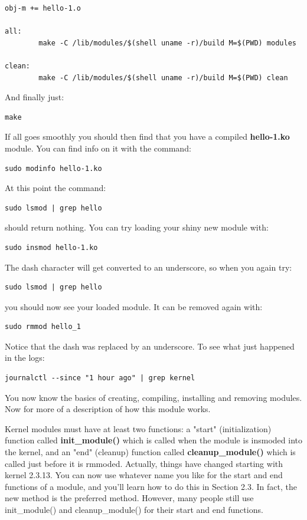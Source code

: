 \documentclass[11pt]{article}
\begin{document}
\begin{verbatim}
obj-m += hello-1.o

all:
        make -C /lib/modules/$(shell uname -r)/build M=$(PWD) modules

clean:
        make -C /lib/modules/$(shell uname -r)/build M=$(PWD) clean
\end{verbatim}

And finally just:

\begin{verbatim}
make
\end{verbatim}

If all goes smoothly you should then find that you have a compiled \textbf{hello-1.ko} module. You can find info on it with the command:

\begin{verbatim}
sudo modinfo hello-1.ko
\end{verbatim}

At this point the command:

\begin{verbatim}
sudo lsmod | grep hello
\end{verbatim}

should return nothing. You can try loading your shiny new module with:

\begin{verbatim}
sudo insmod hello-1.ko
\end{verbatim}

The dash character will get converted to an underscore, so when you again try:

\begin{verbatim}
sudo lsmod | grep hello
\end{verbatim}

you should now see your loaded module. It can be removed again with:

\begin{verbatim}
sudo rmmod hello_1
\end{verbatim}

Notice that the dash was replaced by an underscore. To see what just happened in the logs:

\begin{verbatim}
journalctl --since "1 hour ago" | grep kernel
\end{verbatim}

You now know the basics of creating, compiling, installing and removing modules. Now for more of a description of how this module works.

Kernel modules must have at least two functions: a "start" (initialization) function called \textbf{init\_module()} which is called when the module is insmoded into the kernel, and an "end" (cleanup) function called \textbf{cleanup\_module()} which is called just before it is rmmoded. Actually, things have changed starting with kernel 2.3.13. You can now use whatever name you like for the
start and end functions of a module, and you'll learn how to do this in Section 2.3. In fact, the new method is the preferred method. However, many people still use init\_module() and cleanup\_module() for their start and end functions.
\end{document}
